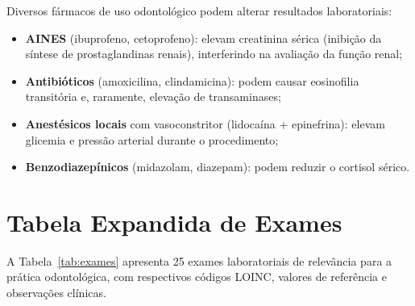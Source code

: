 Diversos fármacos de uso odontológico podem alterar resultados laboratoriais:

\begin{itemize}
    \item \textbf{AINES} (ibuprofeno, cetoprofeno): elevam creatinina sérica (inibição da síntese de prostaglandinas renais), interferindo na avaliação da função renal;
    \item \textbf{Antibióticos} (amoxicilina, clindamicina): podem causar eosinofilia transitória e, raramente, elevação de transaminases;
    \item \textbf{Anestésicos locais} com vasoconstritor (lidocaína + epinefrina): elevam glicemia e pressão arterial durante o procedimento;
    \item \textbf{Benzodiazepínicos} (midazolam, diazepam): podem reduzir o cortisol sérico.
\end{itemize}

\section{Tabela Expandida de Exames}

A Tabela~\ref{tab:exames} apresenta 25 exames laboratoriais de relevância para a prática odontológica, com respectivos códigos LOINC, valores de referência e observações clínicas.

